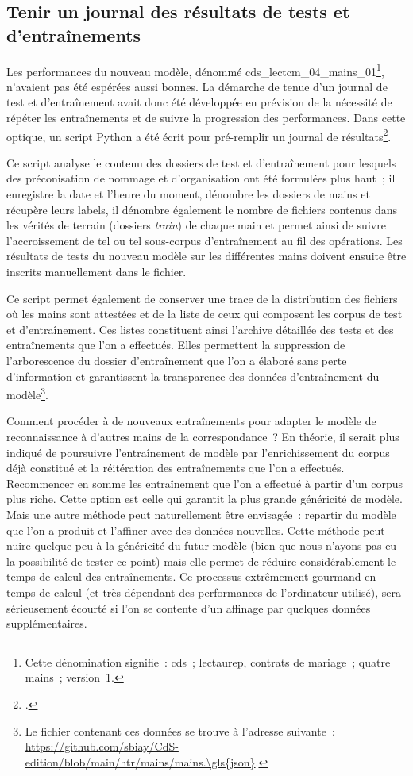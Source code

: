 \documentclass[a4paper,12pt,twoside]{book}
\begin{document}
			\subsection{Tenir un journal des résultats de tests et d'entraînements}
				\label{journal-test}
				Les performances du nouveau modèle, dénommé \textsf{cds\_lectcm\_04\_mains\_01}\footnote{Cette dénomination signifie~: \gls{cds}~; \gls{lectaurep}, contrats de mariage~; quatre mains~; version~1.}, n'avaient pas été espérées aussi bonnes. La démarche de tenue d'un journal de test et d'entraînement avait donc été développée en prévision de la nécessité de répéter les entraînements et de suivre la progression des performances. Dans cette optique, un script Python a été écrit pour pré-remplir un journal de résultats\footcite{biayJournalReconnPy2022}. 
				
				Ce script analyse le contenu des dossiers de test et d'entraînement pour lesquels des préconisation de nommage et d'organisation ont été formulées plus haut~; il enregistre la date et l'heure du moment, dénombre les dossiers de mains et récupère leurs labels, il dénombre également le nombre de fichiers contenus dans les vérités de terrain (dossiers \textit{train}) de chaque main et permet ainsi de suivre l'accroissement de tel ou tel sous-corpus d'entraînement au fil des opérations. Les résultats de tests du nouveau modèle sur les différentes mains doivent ensuite être inscrits manuellement dans le fichier.
				
				Ce script permet également de conserver une trace de la distribution des fichiers où les mains sont attestées et de la liste de ceux qui composent les corpus de test et d'entraînement. Ces listes constituent ainsi l'archive détaillée des tests et des entraînements que l'on a effectués. Elles permettent la suppression de l'arborescence du dossier d'entraînement que l'on a élaboré sans perte d'information et garantissent la transparence des données d'entraînement du modèle\footnote{Le fichier contenant ces données se trouve à l'adresse suivante~: \url{https://github.com/sbiay/CdS-edition/blob/main/htr/mains/mains.\gls{json}}.}.
				
				Comment procéder à de nouveaux entraînements pour adapter le modèle de reconnaissance à d'autres mains de la correspondance~? En théorie, il serait plus indiqué de poursuivre l'entraînement de modèle par l'enrichissement du corpus déjà constitué et la réitération des entraînements que l'on a effectués. Recommencer en somme les entraînement que l'on a effectué à partir d'un corpus plus riche. Cette option est celle qui garantit la plus grande généricité de modèle. Mais une autre méthode peut naturellement être envisagée~: repartir du modèle que l'on a produit et l'affiner avec des données nouvelles. Cette méthode peut nuire quelque peu à la généricité du futur modèle (bien que nous n'ayons pas eu la possibilité de tester ce point) mais elle permet de réduire considérablement le temps de calcul des entraînements. Ce processus extrêmement gourmand en temps de calcul (et très dépendant des performances de l'ordinateur utilisé), sera sérieusement écourté si l'on se contente d'un affinage par quelques données supplémentaires.
							
\end{document}
